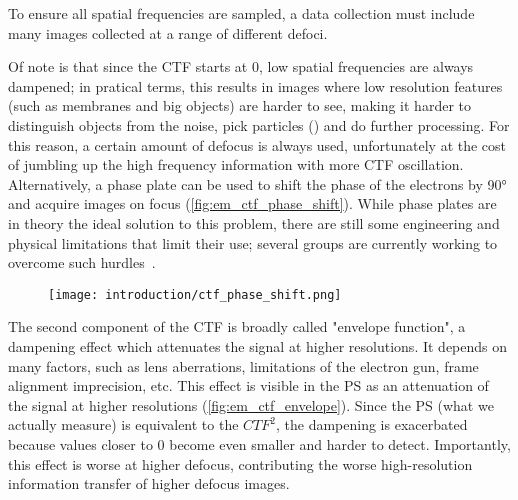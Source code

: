 To ensure all spatial frequencies are sampled, a data collection must include many images collected at a range of different defoci.

Of note is that since the CTF starts at 0, low spatial frequencies are always dampened; in pratical terms, this results in images where low resolution features (such as membranes and big objects) are harder to see, making it harder to distinguish objects from the noise, pick particles () and do further processing.
For this reason, a certain amount of defocus is always used, unfortunately at the cost of jumbling up the high frequency information with more CTF oscillation.
Alternatively, a phase plate can be used to shift the phase of the electrons by 90° and acquire images on focus (\autoref{fig:em_ctf_phase_shift}).
While phase plates are in theory the ideal solution to this problem, there are still some engineering and physical limitations that limit their use; several groups are currently working to overcome such hurdles~\cite{danevExpandingBoundariesCryoEM2017,schwartzLaserPhasePlate2019}.

\begin{figure}[ht]
    \centering
    \texttt{[image: introduction/ctf\_phase\_shift.png]}
    \label{fig:em_ctf_phase_shift}
\end{figure}

The second component of the CTF is broadly called "envelope function", a dampening effect which attenuates the signal at higher resolutions.
It depends on many factors, such as lens aberrations, limitations of the electron gun, frame alignment imprecision, etc.
This effect is visible in the PS as an attenuation of the signal at higher resolutions (\autoref{fig:em_ctf_envelope}).
Since the PS (what we actually measure) is equivalent to the $CTF^2$, the dampening is exacerbated because values closer to 0 become even smaller and harder to detect.
Importantly, this effect is worse at higher defocus, contributing the worse high-resolution information transfer of higher defocus images.

